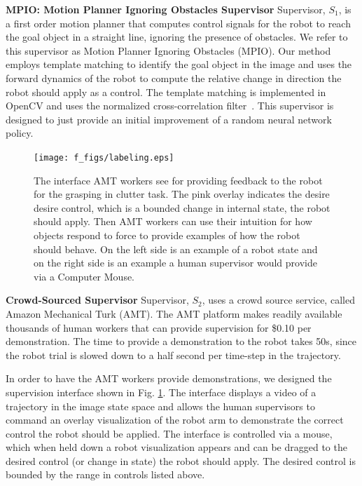 \documentclass[10pt, conference]{ieeeconf}      %
\begin{document}
\noindent \textbf{MPIO: Motion Planner Ignoring Obstacles Supervisor} Supervisor, $S_1$, is a first order motion planner that computes
control signals for the robot to reach the goal object in a straight line, ignoring the presence of obstacles. We refer to this supervisor as Motion Planner  Ignoring Obstacles (MPIO). Our
method employs template matching to identify the goal object in the image and uses the forward dynamics of the robot to
compute the relative change in direction the robot should apply as a control. The template matching is implemented in
OpenCV and uses the normalized cross-correlation filter~\cite{opencv_library}. This supervisor is designed to just provide an initial improvement of a random neural network policy.

\begin{figure}[t]
\centering

\texttt{[image: f\_figs/labeling.eps]}

\caption{\footnotesize  The interface AMT workers see for providing feedback to the robot for the grasping in clutter task. The pink overlay indicates the desire desire control, which is a bounded change in internal state, the robot should apply. Then AMT workers can use their intuition for how objects respond to force to provide examples of how the robot should behave. On the left side is an example of a robot state and on the right side is an example a human supervisor would provide via a Computer Mouse.}
\vspace*{-20pt}
\label{fig:overlays}
\end{figure}

\noindent \textbf{Crowd-Sourced Supervisor} Supervisor, $S_2$, uses a crowd source service, called Amazon
Mechanical Turk (AMT). The AMT platform makes readily available thousands of human workers that can provide 
supervision for \$0.10 per demonstration. The time to provide a demonstration to the robot takes 50s, since the robot trial is slowed down to a half second per time-step in the trajectory. 

In order to have the AMT workers provide demonstrations, we designed the supervision interface shown in Fig. \ref{fig:overlays}. The interface displays a video of a trajectory in the image state space and allows the human supervisors to command an overlay visualization of the robot arm to
demonstrate the correct control the robot should be applied. The interface is controlled via a mouse, which when held down a robot visualization appears and can be dragged to the desired control (or change in state) the robot should apply. The desired control is bounded by the range in controls listed above. 
\end{document}

